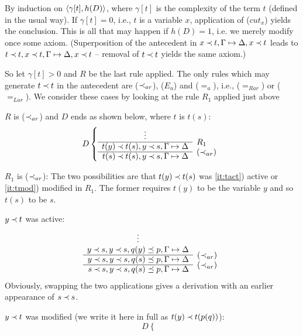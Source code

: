 \begin{PROOF} 
By induction on $\langle\gamma[t],h(D)\rangle$, where $\gamma[t]$ is the complexity of 
the term $t$ (defined in the usual way). 
If $\gamma[t]=0$, i.e., $t$ is a variable $x$,  application of ($cut_x$) yields the 
conclusion. This is all that may happen if $h(D)=1$, i.e. we merely modify once
some axiom. (Superposition of the antecedent in $x\mathbin{\prec} t,\Gamma\mathrel{\mapsto}\Delta,x\mathbin{\prec} t$ leads to
$t\mathbin{\prec} t,x\mathbin{\prec} t,\Gamma\mathrel{\mapsto}\Delta,x\mathbin{\prec} t$ -- removal of $t\mathbin{\prec} t$ yields the same axiom.)

So let $\gamma[t]>0$ and $R$ be the last rule applied.
 The only rules which may generate $t\mathbin{\prec} t$ in the antecedent
are ($\mathbin{\prec}_{ar}$), ($E_a$) and ($=_a$), i.e., ($=_{Rar}$) or
($=_{Lar}$). We consider these cases by looking at the rule $R_1$ applied just above
%
\begin{LS}
\item $R$ is ($\mathbin{\prec}_{ar}$) and $D$ ends as shown below, where $t$ is $t(s)$:
\[ D \left \{ \begin{array}{rl}
\multicolumn{1}{c}{\vdots} \\ \cline{1-1}
t(y)\Incl t(s), y\Incl s, \Gamma\Seq\Delta & \rabove{R_1} \\ \cline{1-1}
t(s) \Incl t(s), y\Incl s, \GSD & \rabove{(\Incl_{ar})} \end{array} \right .\]
%
\begin{LSA}
\item $R_1$ is ($\mathbin{\prec}_{ar}$): The two possibilities are that $t(y)\mathbin{\prec} t(s)$ was
\ref{it:tact}) active
or \ref{it:tmod}) modified in $R_1$. The former requires $t(y)$ to be the variable
 $y$ and so $t(s)$ to be $s$.
\begin{LSB}
\item\label{it:tact} $y\mathbin{\prec} t$ was active:
\[ \begin{array}{rl}
\multicolumn{1}{c}{\vdots} \\ 
y\Incl s, y\Incl s, q(y)\preceq p, \Gamma\Seq\Delta  \\ \cline{1-1}
y\Incl s, y\Incl s, q(s)\preceq p, \Gamma\Seq\Delta & \rabove{(\Incl_{ar})} \\ \cline{1-1}
s\Incl s, y\Incl s, q(s)\preceq p, \GSD & \rabove{(\Incl_{ar})} \end{array} \]
Obviously, swapping the two applications gives a derivation with an earlier
appearance of $s\mathbin{\prec} s$. 
%
\item\label{it:tmod} $y\mathbin{\prec} t$ was modified (we write it here in full as $t(y)\mathbin{\prec} t(p(q))$):
\[ D \left \{ \begin{array}{rl}

\end{array}\]
\end{LSB}
\end{LSA}
\end{LS}
\end{PROOF}
